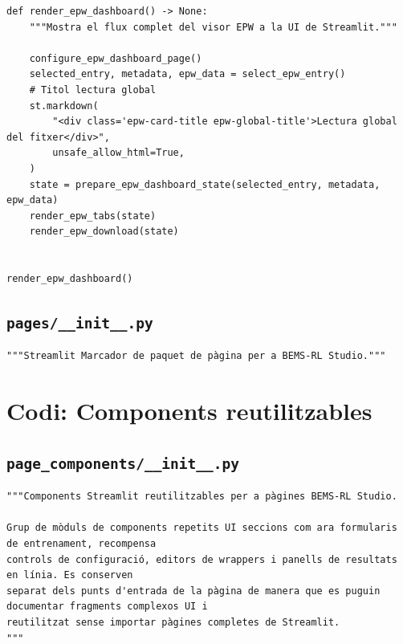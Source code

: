 \documentclass[10pt,a4paper]{article}
\begin{document}
\begin{lstlisting}[style=studioPython,caption={pages/Visor\_Climes\_EPW.py},label={lst:pages-visor-climes-epw-py}]
def render_epw_dashboard() -> None:
    """Mostra el flux complet del visor EPW a la UI de Streamlit."""

    configure_epw_dashboard_page()
    selected_entry, metadata, epw_data = select_epw_entry()
    # Titol lectura global
    st.markdown(
        "<div class='epw-card-title epw-global-title'>Lectura global del fitxer</div>",
        unsafe_allow_html=True,
    )
    state = prepare_epw_dashboard_state(selected_entry, metadata, epw_data)
    render_epw_tabs(state)
    render_epw_download(state)


render_epw_dashboard()
\end{lstlisting}


\subsection{\texorpdfstring{\texttt{pages/\_\_init\_\_.py}}{pages/\_\_init\_\_.py}}

\begin{lstlisting}[style=studioPython,caption={pages/\_\_init\_\_.py},label={lst:pages---init---py}]
"""Streamlit Marcador de paquet de pàgina per a BEMS-RL Studio."""
\end{lstlisting}

\section{Codi: Components reutilitzables}


\subsection{\texorpdfstring{\texttt{page\_components/\_\_init\_\_.py}}{page\_components/\_\_init\_\_.py}}

\begin{lstlisting}[style=studioPython,caption={page\_components/\_\_init\_\_.py},label={lst:page-components---init---py}]
"""Components Streamlit reutilitzables per a pàgines BEMS-RL Studio.

Grup de mòduls de components repetits UI seccions com ara formularis de entrenament, recompensa
controls de configuració, editors de wrappers i panells de resultats en línia. Es conserven
separat dels punts d'entrada de la pàgina de manera que es puguin documentar fragments complexos UI i
reutilitzat sense importar pàgines completes de Streamlit.
"""
\end{lstlisting}
\end{document}
